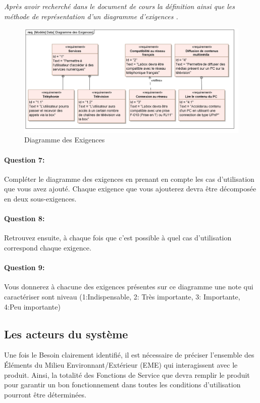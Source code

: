 \textit{Après avoir recherché dans le document de cours la définition ainsi que les méthode de représentation d'un \og diagramme d'exigences \fg.}

\begin{figure}[!h]
\begin{center}
\includegraphics[width=0.9\linewidth]{img/Freebox_exigences}
\caption{Diagramme des Exigences}
\label{fig:image38}
\end{center}
\end{figure}


\paragraph{Question 7:} Compléter le diagramme des exigences en prenant en compte les cas d'utilisation que vous avez ajouté. Chaque exigence que vous ajouterez devra être décomposée en deux sous-exigences.

\paragraph{Question 8:} Retrouvez ensuite, à chaque fois que c'est possible à quel cas d'utilisation correspond chaque exigence.

\paragraph{Question 9:} Vous donnerez à chacune des exigences présentes sur ce diagramme une note qui caractériser sont niveau (1:Indispensable, 2: Très importante, 3: Importante, 4:Peu importante)

\subsection{Les acteurs du système}

Une fois le Besoin clairement identifié, il est nécessaire de préciser l'ensemble des Éléments du Milieu Environnant/Extérieur (EME) qui interagissent avec le produit. Ainsi, la totalité des Fonctions de Service que devra remplir le produit pour garantir un bon fonctionnement dans toutes les conditions d'utilisation pourront être déterminées.

